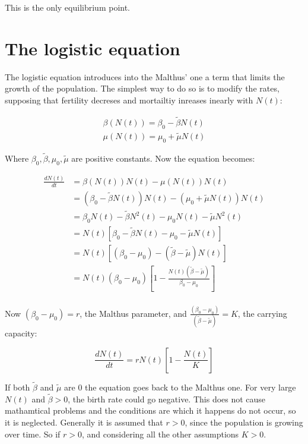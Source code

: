 This is the only equilibrium point.

\section{The logistic equation}
The logistic equation introduces into the Malthus' one a term that limits the growth of the population.
The simplest way to do so is to modify the rates, supposing that fertility decreses and mortailtiy inreases inearly with $N(t)$:

\begin{align*}
  \beta(N(t)) = \beta_0 - \tilde{\beta}N(t)\\
  \mu(N(t)) = \mu_0 + \tilde{\mu}N(t)
\end{align*}

Where $\beta_0, \tilde{\beta}, \mu_0, \tilde{\mu}$ are positive constants.
Now the equation becomes:

\begin{align*}
  \frac{dN(t)}{dt} &= \beta(N(t))N(t) - \mu(N(t))N(t)\\
                   &= (\beta_0 - \tilde{\beta}N(t))N(t) - (\mu_0 + \tilde{\mu}N(t))N(t)\\
                   &= \beta_0N(t) - \tilde{\beta}N^2(t) - \mu_0N(t) - \tilde{\mu}N^2(t)\\
                   &= N(t)\left[\beta_0 - \tilde{\beta}N(t) - \mu_0 - \tilde{\mu}N(t)\right]\\
                   &= N(t)\left[(\beta_0 - \mu_0) - (\tilde{\beta} - \tilde{\mu})N(t)\right]\\
                   &= N(t)(\beta_0-\mu_0)\left[1-\frac{N(t)(\tilde{\beta}-\tilde{\mu})}{\beta_0-\mu_0}\right]\\
\end{align*}

Now $(\beta_0-\mu_0) = r$, the Malthus parameter, and $\frac{(\beta_0-\mu_0)}{(\tilde{\beta}-\tilde{\mu})} = K$, the carrying capacity:


$$\frac{dN(t)}{dt} = rN(t)\left[1-\frac{N(t)}{K}\right]$$

If both $\tilde{\beta}$ and $\tilde{\mu}$ are $0$ the equation goes back to the Malthus one.
For very large $N(t)$ and $\tilde{\beta}>0$, the birth rate could go negative.
This does not cause mathamtical problems and the conditions are which it happens do not occur, so it is neglected.
Generally it is assumed that $r>0$, since the population is growing over time.
So if $r>0$, and considering all the other assumptions $K>0$.

